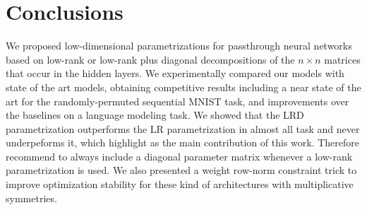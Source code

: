 \documentclass[11pt,a4paper]{article}
\begin{document}
\section{Conclusions}

We proposed low-dimensional parametrizations for passthrough neural networks based on low-rank  or low-rank plus diagonal decompositions of the $n \times n$ matrices that occur in the hidden layers.
We experimentally compared our models with state of the art models, obtaining competitive results including a near state of the art for the randomly-permuted sequential MNIST task, and improvements over the baselines on a language modeling task.
We showed that the LRD parametrization outperforms the LR parametrization in almost all task and never underpeforms it, which highlight as the main contribution of this work.
Therefore recommend to always include a diagonal parameter matrix whenever a low-rank parametrization is used.
We also presented a weight row-norm constraint trick to improve optimization stability for these kind of architectures with multiplicative symmetries.





\end{document}
